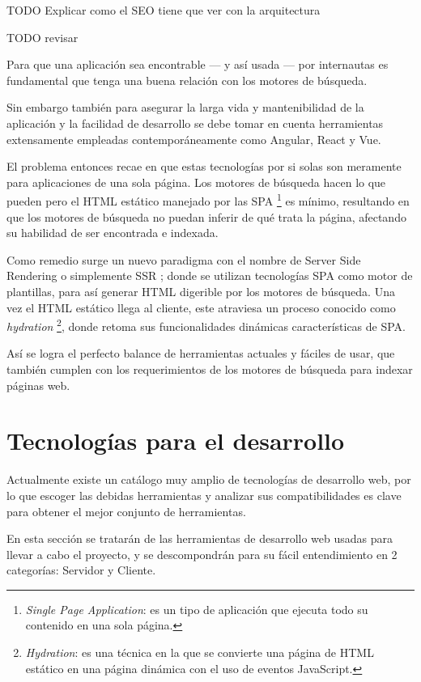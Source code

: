 TODO Explicar como el SEO tiene que ver con la arquitectura

TODO revisar

Para que una aplicación sea encontrable — y así usada — por internautas es fundamental que tenga una buena relación con los motores de búsqueda.

Sin embargo también para asegurar la larga vida y mantenibilidad de la aplicación y la facilidad de desarrollo se debe tomar en cuenta herramientas extensamente empleadas contemporáneamente como Angular, React y Vue.

El problema entonces recae en que estas tecnologías por si solas son meramente para aplicaciones de una sola página. Los motores de búsqueda hacen lo que pueden pero el HTML estático manejado por las SPA \footnote{\textit{Single Page Application}: es un tipo de aplicación que ejecuta todo su contenido en una sola página.} es mínimo, resultando en que los motores de búsqueda no puedan inferir de qué trata la página, afectando su habilidad de ser encontrada e indexada.

Como remedio surge un nuevo paradigma con el nombre de Server Side Rendering o simplemente SSR \cite{ServerSideRendering}; donde se utilizan  tecnologías SPA como motor de plantillas, para así generar HTML digerible por los motores de búsqueda. Una vez el HTML estático llega al cliente, este atraviesa un proceso conocido como \textit{hydration} \footnote{\textit{Hydration}: es una técnica en la que se convierte una página de HTML estático en una página dinámica con el uso de eventos JavaScript.}, donde retoma sus funcionalidades dinámicas características de SPA.

Así se logra el perfecto balance de herramientas actuales y fáciles de usar, que también cumplen con los requerimientos de los motores de búsqueda para indexar páginas web.

\section{Tecnologías para el desarrollo}

Actualmente existe un catálogo muy amplio de tecnologías de desarrollo web, por lo que escoger las debidas herramientas y analizar sus compatibilidades es clave para obtener el mejor conjunto de herramientas.

En esta sección se tratarán de las herramientas de desarrollo web usadas para llevar a cabo el proyecto, y se descompondrán para su fácil entendimiento en 2 categorías: Servidor y Cliente.


